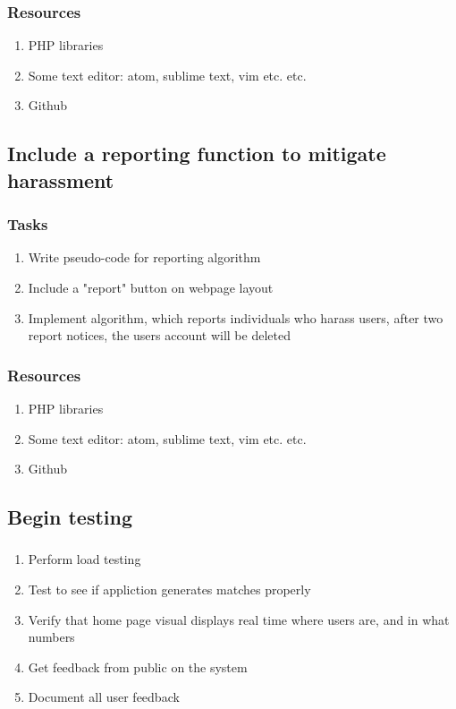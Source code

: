\documentclass[12pt]{article}
\begin{document}
	  	\subsubsection{\bf Resources}
				\begin{enumerate}
 					\item PHP libraries
			 		\item Some text editor: atom, sublime text, vim etc. etc.
			 		\item Github
				\end{enumerate}

		\subsection{\bf Include a reporting function to mitigate harassment }
			\subsubsection{\bf Tasks}
				\begin{enumerate}
					\item Write pseudo-code for reporting algorithm
					\item Include a "report" button on webpage layout
					\item Implement algorithm, which reports individuals who harass users, after two report notices, the users account will be deleted
				\end{enumerate}
	  	\subsubsection{\bf Resources}
				\begin{enumerate}
 					\item PHP libraries
			 		\item Some text editor: atom, sublime text, vim etc. etc.
			 		\item Github
				\end{enumerate}

		\subsection{\bf Begin testing}
			\subsubsection{\bf }
				\begin{enumerate}
					\item Perform load testing
					\item Test to see if appliction generates matches properly
					\item Verify that home page visual displays real time where users are, and in what numbers
					\item Get feedback from public on the system
					\item Document all user feedback
				\end{enumerate}
\end{document}
